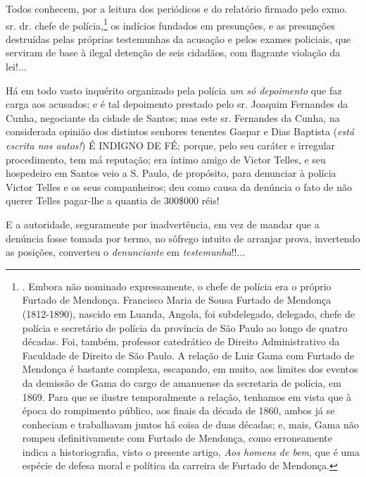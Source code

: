 Todos conhecem, por a leitura dos periódicos e do relatório firmado pelo
exmo. sr. dr. chefe de polícia,\footnote{. Embora não nominado
  expressamente, o chefe de polícia era o próprio Furtado de Mendonça.
  Francisco Maria de Sousa Furtado de Mendonça (1812-1890), nascido em
  Luanda, Angola, foi subdelegado, delegado, chefe de polícia e
  secretário de polícia da província de São Paulo ao longo de quatro
  décadas. Foi, também, professor catedrático de Direito Administrativo
  da Faculdade de Direito de São Paulo. A relação de Luiz Gama com
  Furtado de Mendonça é bastante complexa, escapando, em muito, aos
  limites dos eventos da demissão de Gama do cargo de amanuense da
  secretaria de polícia, em 1869. Para que se ilustre temporalmente a
  relação, tenhamos em vista que à época do rompimento público, aos
  finais da década de 1860, ambos já se conheciam e trabalhavam juntos
  há coisa de duas décadas; e, mais, Gama não rompeu definitivamente com
  Furtado de Mendonça, como erroneamente indica a historiografia, visto
  o presente artigo, \emph{Aos homens de bem}, que é uma espécie de
  defesa moral e política da carreira de Furtado de Mendonça.} os
indícios fundados em presunções, e as presunções destruídas pelas
próprias testemunhas da acusação e pelos exames policiais, que serviram
de base à ilegal detenção de seis cidadãos, com flagrante violação da
lei!...

Há em todo vasto inquérito organizado pela polícia \emph{um só
depoimento} que faz carga aos acusados; e é tal depoimento prestado pelo
sr. Joaquim Fernandes da Cunha, negociante da cidade de Santos; mas este
sr. Fernandes da Cunha, na considerada opinião dos distintos senhores
tenentes Gaspar e Dias Baptista (\emph{está escrita nos autos!}) É
INDIGNO DE FÉ; porque, pelo seu caráter e irregular procedimento, tem má
reputação; era íntimo amigo de Victor Telles, e seu hospedeiro em Santos
veio a S. Paulo, de propósito, para denunciar à polícia Victor Telles e
os seus companheiros; deu como causa da denúncia o fato de não querer
Telles pagar-lhe a quantia de 300\$000 réis!

E a autoridade, seguramente por inadvertência, em vez de mandar que a
denúncia fosse tomada por termo, no sôfrego intuito de arranjar prova,
invertendo as posições, converteu o \emph{denunciante} em
\emph{testemunha}!!...

